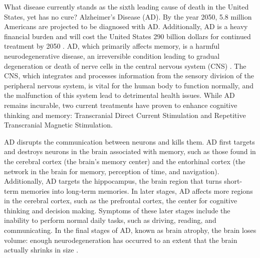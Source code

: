 What disease currently stands as the sixth leading cause of death in the United States, yet has no cure? Alzheimer’s Disease (AD). By the year 2050, 5.8 million Americans are projected to be diagnosed with AD. Additionally, AD is a heavy financial burden and will cost the United States 290 billion dollars for continued treatment by 2050 \cite{Association}. AD, which primarily affects memory, is a harmful neurodegenerative disease, an irreversible condition leading to gradual degeneration or death of nerve cells in the central nervous system (CNS) \cite{JNPD}. The CNS, which integrates and processes information from the sensory division of the peripheral nervous system, is vital for the human body to function normally, and the malfunction of this system lead to detrimental health issues. While AD remains incurable, two current treatments have proven to enhance cognitive thinking and memory: Transcranial Direct Current Stimulation and Repetitive Transcranial Magnetic Stimulation.

AD disrupts the communication between neurons and kills them. AD first targets and destroys neurons in the brain associated with memory, such as those found in the cerebral cortex (the brain’s memory center) and the entorhinal cortex (the network in the brain for memory, perception of time, and navigation). Additionally, AD targets the hippocampus, the brain region that turns short-term memories into long-term memories. In later stages, AD affects more regions in the cerebral cortex, such as the prefrontal cortex, the center for cognitive thinking and decision making. Symptoms of these later stages include the inability to perform normal daily tasks, such as driving, reading, and communicating. In the final stages of AD, known as brain atrophy, the brain loses volume: enough neurodegeneration has occurred to an extent that the brain actually shrinks in size \cite{Health}.

